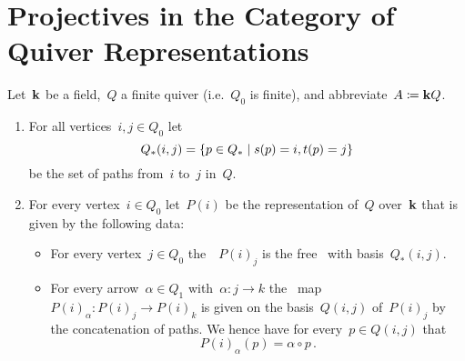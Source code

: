 \section{Projectives in the Category of Quiver Representations}


\begin{conventionnonum}
  Let~$\mathbf{k}$ be a field,~$Q$ a finite quiver (i.e.~$Q_0$ is finite), and abbreviate~$A \coloneqq \mathbf{k} Q$.
\end{conventionnonum}


\begin{definition}
  \leavevmode
  \begin{enumerate}
    \item
      For all vertices~$i, j \in Q_0$ let
      \[
        Q_*(i,j)
        =
        \{
          p \in Q_*
        \suchthat
          s(p) = i,
          t(p) = j
        \}
      \]
      be the set of paths from~$i$ to~$j$ in~$Q$.
    \item
      For every vertex~$i \in Q_0$ let~$P(i)$ be the representation of~$Q$ over~$\mathbf{k}$ that is given by the following data:
      \begin{itemize}
        \item
          For every vertex~$j \in Q_0$ the~{\kvs}~$P(i)_j$ is the free~{\kvs} with basis~$Q_*(i,j)$.
        \item
          For every arrow~$\alpha \in Q_1$ with~$\alpha \colon j \to k$ the~{\klin} map~$P(i)_\alpha \colon P(i)_j \to P(i)_k$ is given on the basis~$Q(i,j)$ of~$P(i)_j$ by the concatenation of paths.
          We hence have for every~$p \in Q(i,j)$ that
          \[
            P(i)_\alpha(p)
            =
            \alpha \circ p  \,.
          \]
      \end{itemize}
  \end{enumerate}
\end{definition}


